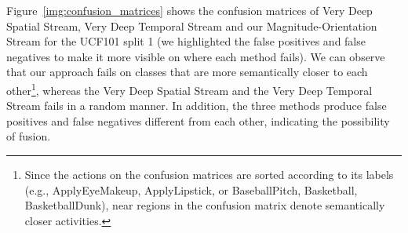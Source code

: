 \documentclass[10pt,conference]{IEEEtran}
\begin{document}

Figure~\ref{img:confusion_matrices} shows the confusion matrices of Very Deep Spatial Stream, Very Deep Temporal Stream and our Magnitude-Orientation Stream for the UCF101 split 1 (we highlighted the false positives and false negatives to make it more visible on where each method fails). We can observe that our approach fails on classes that are more semantically closer to each other\footnote{Since the actions on the confusion matrices are sorted according to its labels (e.g., ApplyEyeMakeup, ApplyLipstick, or BaseballPitch, Basketball, BasketballDunk), near regions in the confusion matrix denote  semantically closer activities.}, whereas the Very Deep Spatial Stream and the Very Deep Temporal Stream fails in a random manner. In addition, the three methods produce false positives and false negatives different from each other, indicating the possibility of fusion. 
\end{document}
